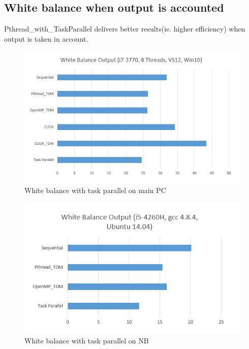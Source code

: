 \documentclass{acm_proc_article-sp}
\begin{document}
\subsection{White balance when output is accounted}
Pthread\_with\_TaskParallel delivers better results(ie. higher efficiency) when output is taken in account.
\begin{figure}[H]
  \includegraphics[width=\linewidth,natwidth=748,natheight=459]{taskparallel_pc.png}
  \caption{White balance with task parallel on main PC}
  \label{fig:taskparallel_pc}
\end{figure}
\begin{figure}[H]
  \includegraphics[width=\linewidth,natwidth=590,natheight=359]{taskparallel_nb.png}
  \caption{White balance with task parallel on NB}
  \label{fig:taskparallel_nb}
\end{figure}
\end{document}
